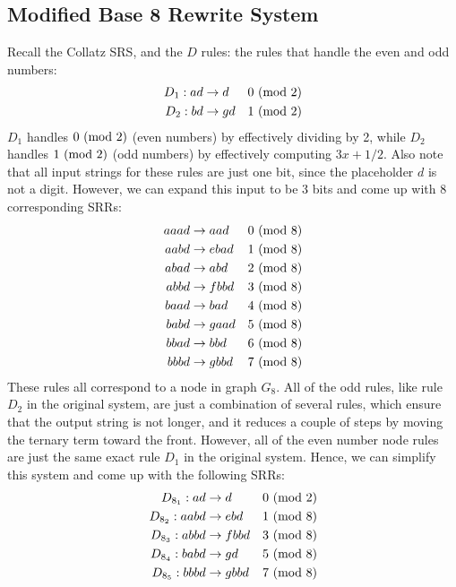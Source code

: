 \subsection{Modified Base 8 Rewrite System} \label{subsec:base8rewrite}
Recall the Collatz SRS, and the $D$ rules: the rules that handle the even and odd numbers:
\begin{align*}
    D_1: ad &\rightarrow d &\text{$0\ (\mathrm{mod}\ 2)$}\\
    D_2: bd &\rightarrow gd &\text{$1\ (\mathrm{mod}\ 2)$}\\
\end{align*}
$D_1$ handles $0 \ (\mathrm{mod}\ 2)$ (even numbers) by effectively dividing by 2, while $D_2$ handles $1 \ (\mathrm{mod}\ 2)$ (odd numbers)  by effectively computing $3x+1/2$. Also note that all input strings for these rules are just one bit, since the placeholder $d$ is not a digit. However, we can expand this input to be 3 bits and come up with 8 corresponding SRRs:
\begin{align*}
    aaad &\rightarrow aad &\text{$0\ (\mathrm{mod}\ 8)$}\\
    aabd &\rightarrow ebad &\text{$1\ (\mathrm{mod}\ 8)$}\\
    abad &\rightarrow abd &\text{$2\ (\mathrm{mod}\ 8)$}\\
    abbd &\rightarrow fbbd &\text{$3\ (\mathrm{mod}\ 8)$}\\
    baad &\rightarrow bad &\text{$4\ (\mathrm{mod}\ 8)$}\\
    babd &\rightarrow gaad &\text{$5\ (\mathrm{mod}\ 8)$}\\
    bbad &\rightarrow bbd &\text{$6\ (\mathrm{mod}\ 8)$}\\
    bbbd &\rightarrow gbbd &\text{$7\ (\mathrm{mod}\ 8)$}
\end{align*}
These rules all correspond to a node in graph $G_8$. All of the odd rules, like rule $D_2$ in the original system, are just a combination of several rules, which ensure that the output string is not longer, and it reduces a couple of steps by moving the ternary term toward the front. However, all of the even number node rules are just the same exact rule $D_1$ in the original system. Hence, we can simplify this system and come up with the following SRRs:
\begin{align*}
    D_{8_1}: ad &\rightarrow d &\text{$0\ (\mathrm{mod}\ 2)$}\\
    D_{8_2}: aabd &\rightarrow ebd &\text{$1\ (\mathrm{mod}\ 8)$}\\
    D_{8_3}: abbd &\rightarrow fbbd &\text{$3\ (\mathrm{mod}\ 8)$}\\
    D_{8_4}: babd &\rightarrow gd &\text{$5\ (\mathrm{mod}\ 8)$}\\
    D_{8_5}: bbbd &\rightarrow gbbd &\text{$7\ (\mathrm{mod}\ 8)$}
\end{align*}
